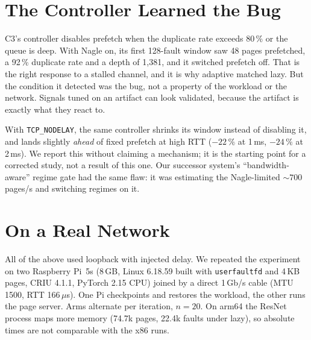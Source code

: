 \documentclass[conference]{IEEEtran}
\newcommand{\uffd}{\texttt{userfaultfd}\xspace}
\newcommand{\nd}{\texttt{TCP\_NODELAY}\xspace}
\newcommand{\us}{\,$\mu$s\xspace}
\begin{document}
\section{The Controller Learned the Bug}
\label{sec:controller}

C3's controller disables prefetch when the duplicate rate exceeds 80\,\% or
the queue is deep. With Nagle on, its first 128-fault window saw 48 pages
prefetched, a 92\,\% duplicate rate and a depth of 1{,}381, and it switched
prefetch off. That is the right response to a stalled channel, and it is why
adaptive matched lazy. But the condition it detected was the bug, not a
property of the workload or the network. Signals tuned on an artifact can
look validated, because the artifact is exactly what they react to.

With \nd, the same controller shrinks its window instead of disabling it,
and lands slightly \emph{ahead} of fixed prefetch at high RTT ($-22\,\%$ at
1\,ms, $-24\,\%$ at 2\,ms). We report this without claiming a mechanism; it
is the starting point for a corrected study, not a result of this one. Our
successor system's ``bandwidth-aware'' regime gate had the same flaw: it was
estimating the Nagle-limited ${\sim}700$ pages/s and switching regimes on it.

\section{On a Real Network}
\label{sec:real}

All of the above used loopback with injected delay. We repeated the
experiment on two Raspberry Pi~5s (8\,GB, Linux 6.18.59 built with
\uffd and 4\,KB pages, CRIU 4.1.1, PyTorch 2.15 CPU) joined by a direct
1\,Gb/s cable (MTU 1500, RTT 166\us). One Pi checkpoints and restores the
workload, the other runs the page server. Arms alternate per iteration,
$n\!=\!20$. On arm64 the ResNet process maps more memory (74.7k pages, 22.4k
faults under lazy), so absolute times are not comparable with the x86 runs.
\end{document}
